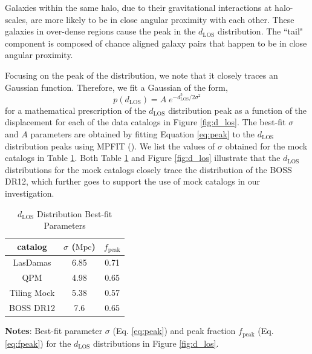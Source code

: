 \documentclass{emulateapj}
\begin{document}
Galaxies within the same halo, due to their gravitational interactions at halo-scales, are more likely to be in close angular proximity with each other. These galaxies in over-dense regions cause the peak in the $d_{\mathrm{LOS}}$ distribution. The ``tail" component is composed of chance aligned galaxy pairs that happen to be in close angular proximity. 

Focusing on the peak of the distribution, we note that it closely traces an Gaussian function. Therefore, we fit a Gaussian of the form, 
\begin{equation} \label{eq:peak} 
p(d_{\mathrm{LOS}}) = A \; e^{-{d_{\mathrm{LOS}}^2}/{2\sigma^2}}
\end{equation}
 for a mathematical prescription of the $d_{\mathrm{LOS}}$ distribution peak as a function of the displacement for each of the data catalogs in Figure \ref{fig:d_los}. The best-fit $\sigma$ and $A$ parameters are obtained by fitting Equation \ref{eq:peak} to the $d_{\mathrm{LOS}}$ distribution peaks using MPFIT (\citealt{Markwardt:2009aa}). We list the values of $\sigma$ obtained for the mock catalogs in Table \ref{tab:mpfit}. Both Table \ref{tab:mpfit} and Figure \ref{fig:d_los} illustrate that the $d_{\mathrm{LOS}}$ distributions for the mock catalogs closely trace the distribution of the BOSS DR12, which further goes to support the use of mock catalogs in our investigation.  
 
 \begin{table} 
 \caption{$d_{\mathrm{LOS}}$ Distribution Best-fit Parameters} \label{tab:mpfit}
 \begin{spacing}{1.5}
 \begin{center}
 \leavevmode
 \begin{tabular}{ccc} \hline \hline
catalog &$\sigma$ ($\mathrm{Mpc}$) & $f_{\mathrm{peak}}$\\ \hline
LasDamas 	& 6.85	& 0.71 \\ 
QPM 		& 4.98	& 0.65 \\ 
Tiling Mock 	& 5.38	& 0.57 \\ 
BOSS DR12 	& 7.6		& 0.65 \\ \hline
\end{tabular} \par
\end{center}
\end{spacing}
{\bf Notes}: Best-fit parameter $\sigma$ (Eq. \ref{eq:peak}) and peak fraction $f_{\mathrm{peak}}$ (Eq. \ref{eq:fpeak}) for the $d_{\mathrm{LOS}}$ distributions in Figure \ref{fig:d_los}. 
\end{table}
\end{document}
